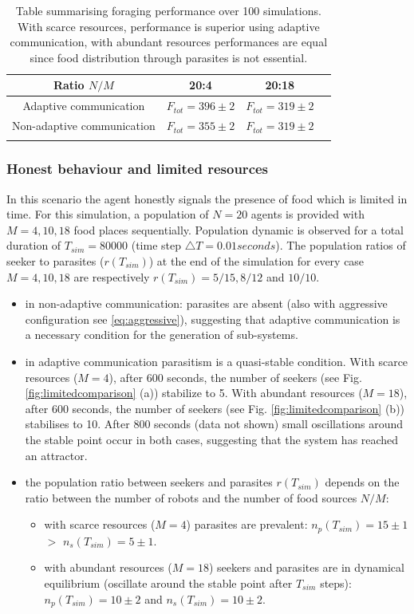 \begin{table}[htbp]
\caption[Foraging performance with unlimited resources]{
Table summarising foraging performance over 100 simulations.
With scarce resources, performance is superior using adaptive communication,
with abundant resources performances are equal since food distribution
through parasites is not essential.}
{
\begin{tabular}{@{}cccc@{}}
\hline
Ratio $N/M$ & 20:4 & 20:18\\
\hline
Adaptive communication & $F_{tot}=396\pm2$ & $F_{tot}=319\pm2$\\
\hline
Non-adaptive communication & $F_{tot}=355\pm2$ & $F_{tot}=319\pm2$\\
\hline
\label{tab:performance}
\end{tabular}}
\end{table}

\subsubsection{Honest behaviour and limited resources}
In this scenario the agent honestly signals the presence of food which is limited in time.
For this simulation, a population of $N=20$ agents is provided with $M=4,10,18$
food places sequentially. Population dynamic is observed for a total duration
of  $T_{sim}=80000$ (time step $\triangle T=0.01 seconds$).
The population ratios of seeker to parasites ($r(T_{sim})$) at the end of
the simulation for every case $M=4,10,18$ are respectively $r(T_{sim})=5/15,8/12$
and $10/10$.
\begin{itemize}
\item in non-adaptive communication: parasites are absent (also with aggressive
configuration see \ref{eq:aggressive}), suggesting that adaptive communication
is a necessary condition for the generation of sub-systems.
\item in adaptive communication parasitism is a quasi-stable condition.
With scarce resources ($M=4$), after 600 seconds, the number of seekers
(see Fig. \ref{fig:limitedcomparison} (a)) stabilize to 5. With abundant resources ($M=18$),
after 600 seconds, the number of seekers (see Fig. \ref{fig:limitedcomparison} (b))
stabilises to 10. After 800 seconds (data not shown) small oscillations around
the stable point occur in both cases, suggesting that the system has reached an attractor.
\item the population ratio between seekers and parasites $r(T_{sim})$ depends
on the ratio between the number of robots and the number of food sources $N/M$:
\begin{itemize}
\item with scarce resources ($M=4$) parasites are prevalent:
$n_{p}(T_{sim})=15\pm1$ $>$ $n_{s}(T_{sim})=5\pm1$.
\item with abundant resources ($M=18$) seekers and parasites are in dynamical
equilibrium (oscillate around the stable point after $T_{sim}$ steps):
$n_{p}(T_{sim})=10\pm2$ and $n_{s}(T_{sim})=10\pm2$.
\end{itemize}
\end{itemize}

